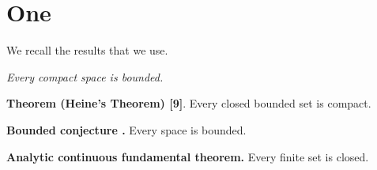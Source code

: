 \documentclass{article}
\begin{document}
\section{One}
We recall the results that we use.

 {\it Every compact space is bounded.}

{\bf Theorem (Heine's Theorem) [9]}. Every closed bounded set is compact.

\noindent\textbf{Bounded conjecture \cite{key}.} Every space is bounded.

\textbf{Analytic continuous fundamental theorem.} Every finite set is closed.
\end{document}
